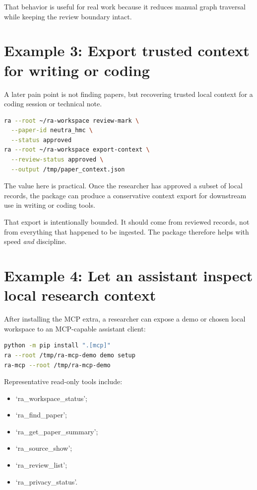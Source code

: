 \documentclass[11pt,a4paper,openany]{book}
\begin{document}
That behavior is useful for real work because it reduces manual graph traversal
while keeping the review boundary intact.

\section{Example 3: Export trusted context for writing or coding}

A later pain point is not finding papers, but recovering trusted local context
for a coding session or technical note.

\begin{lstlisting}[language=bash]
ra --root ~/ra-workspace review-mark \
  --paper-id neutra_hmc \
  --status approved
ra --root ~/ra-workspace export-context \
  --review-status approved \
  --output /tmp/paper_context.json
\end{lstlisting}

The value here is practical. Once the researcher has approved a subset of local
records, the package can produce a conservative context export for downstream use
in writing or coding tools.

That export is intentionally bounded. It should come from reviewed records, not
from everything that happened to be ingested. The package therefore helps with
speed \emph{and} discipline.

\section{Example 4: Let an assistant inspect local research context}

After installing the MCP extra, a researcher can expose a demo or chosen local
workspace to an MCP-capable assistant client:

\begin{lstlisting}[language=bash]
python -m pip install ".[mcp]"
ra --root /tmp/ra-mcp-demo demo setup
ra-mcp --root /tmp/ra-mcp-demo
\end{lstlisting}

Representative read-only tools include:
\begin{itemize}[nosep]
  \item `ra\_workspace\_status';
  \item `ra\_find\_paper';
  \item `ra\_get\_paper\_summary';
  \item `ra\_source\_show';
  \item `ra\_review\_list';
  \item `ra\_privacy\_status'.
\end{itemize}
\end{document}
